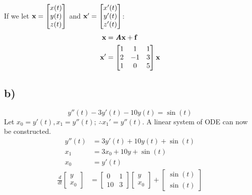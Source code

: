 \documentclass{article}
\begin{document}
\begin{enumerate}[label = \textbf{\arabic*)}]
\begin{align*}
		\end{align*}
		If we let $ \textbf{x} = \begin{bmatrix} x(t) \\ y(t) \\ z(t) \end{bmatrix} $ and $ \textbf{x}' = \begin{bmatrix} x'(t) \\ y'(t) \\ z'(t) \end{bmatrix} $:
		\begin{align*}
			\textbf{x} & = \textbf{\textit{A}}\textbf{x} + \textbf{f} \\
			\textbf{x}' & =
				\begin{bmatrix}
					1 & 1 & 1 \\
					2 & -1 & 3 \\
					1 & 0 & 5
				\end{bmatrix} \textbf{x}
		\end{align*}
\end{enumerate}

\subsection{b)}

$$ y''(t) - 3y'(t) - 10y(t) = \sin(t) $$
Let $ x_0 = y'(t), x_1 = y''(t) $; $ \therefore x_1' = y''(t) $. A linear system of ODE can now be constructed.
\begin{align*}
	y''(t) & = 3y'(t) + 10y(t) + \sin(t) \\
	x_1 & = 3x_0 + 10y + \sin(t) \\
	x_0 & = y'(t)
\end{align*}
\begin{align*}
	\frac{d}{dt} \begin{bmatrix} y \\ x_0 \end{bmatrix} & =
		\begin{bmatrix}
			0 & 1 \\
			10 & 3
		\end{bmatrix}
		\begin{bmatrix} y \\ x_0 \end{bmatrix}
		+ \begin{bmatrix} \sin(t) \\ \sin(t) \end{bmatrix}
\end{align*}
\end{document}
